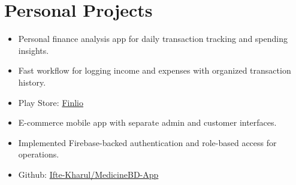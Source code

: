 \documentclass[]{plushcv}
\begin{document}
\begin{minipage}[t]{0.6\textwidth}
\section{Personal Projects}
\begin{itemize}[leftmargin=*,noitemsep,topsep=2pt]
\item Personal finance analysis app for daily transaction tracking and spending insights.
\item Fast workflow for logging income and expenses with organized transaction history.
\item Play Store: \href{https://play.google.com/store/apps/details?id=com.codentity.finlio}{Finlio}
\end{itemize}

\begin{itemize}[leftmargin=*,noitemsep,topsep=2pt]
\item E-commerce mobile app with separate admin and customer interfaces.
\item Implemented Firebase-backed authentication and role-based access for operations.
\item Github: \href{https://github.com/Ifte-Kharul/MedicineBD-App}{Ifte-Kharul/MedicineBD-App}
\end{itemize}

\end{minipage}
\hfill
\end{document}
